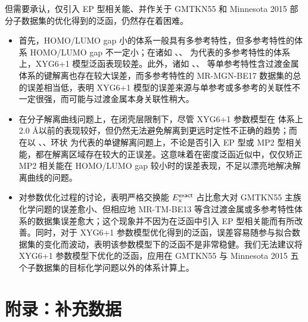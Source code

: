 但需要承认，仅引入 EP 型相关能、并作关于 GMTKN55 和 Minnesota 2015 部分子数据集的优化得到的泛函，仍然存在着困难。
\begin{itemize}[nosep]
  \item 首先，HOMO/LUMO gap 小的体系一般具有多参考特性，但多参考特性的体系 HOMO/LUMO gap 不一定小；在诸如 、、 为代表的多参考特性的体系上，XYG6+1 模型泛函表现较差。此外，诸如 、、 等单参考特性含过渡金属体系的键解离也存在较大误差，而多参考特性的 MR-MGN-BE17 数据集的总的误差相当低，表明 XYG6+1 模型的误差来源与单参考或多参考的关联性不一定很强，而可能与过渡金属本身关联性稍大。
  \item 在分子解离曲线问题上，在闭壳层限制下，尽管 XYG6+1 参数模型在  体系上 2.0 \AA 以前的表现较好，但仍然无法避免解离到更远时定性不正确的趋势；而在以 、、环状  为代表的单键解离问题上，不论是否引入 EP 型或 MP2 型相关能，都在解离区域存在较大的正误差。这意味着在密度泛函近似中，仅仅矫正 MP2 相关能在 HOMO/LUMO gap 较小时的误差表现，不足以漂亮地解决解离曲线的问题。
  \item 对参数优化过程的讨论，表明严格交换能 $E_\mathrm{x}^{\textsf{exact}}$ 占比愈大对 GMTKN55 主族化学问题的误差愈小、但相应地 MR-TM-BE13 等含过渡金属或多参考特性体系的数据集误差愈大；这个现象并不因为在泛函中引入 EP 型相关能而有所改善。同时，对于 XYG6+1 参数模型优化得到的泛函，误差容易随参与拟合数据集的变化而波动，表明该参数模型下的泛函不是非常稳健。我们无法建议将 XYG6+1 参数模型下优化的泛函，应用在 GMTKN55 与 Minnesota 2015 五个子数据集的目标化学问题以外的体系计算上。
\end{itemize}

\clearpage

\section{附录：补充数据}

